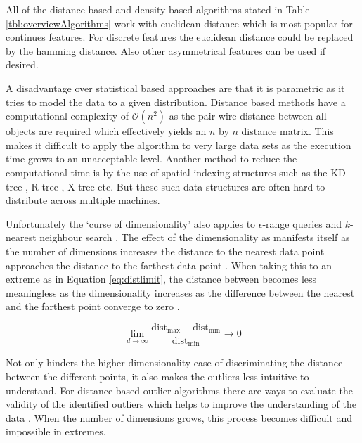 All of the distance-based and density-based algorithms stated in Table \ref{tbl:overviewAlgorithms} work with euclidean distance which is most popular for continues features. For discrete features the euclidean distance could be replaced by the hamming distance. Also other asymmetrical features can be used if desired. 

A disadvantage over statistical based approaches are that it is parametric as it tries to model the data to a given distribution. Distance based methods have a computational complexity of $\mathcal{O}(n^{2})$ as the pair-wire distance between all objects are required which effectively yields an $n$ by $n$ distance matrix. This makes it difficult to apply the algorithm to very large data sets as the execution time grows to an unacceptable level. Another method to reduce the computational time is by the use of spatial indexing structures such as the KD-tree \cite{Bentley:1975:MBS:361002.361007}, R-tree \cite{Guttman:1984:RDI:971697.602266}, X-tree \cite{Berchtold:1996:XIS:645922.673502} etc. But these such data-structures are often hard to distribute across multiple machines.

Unfortunately the `curse of dimensionality' also applies to $\epsilon$-range queries and $k$-nearest neighbour search \cite{citeulike:12369622}. The effect of the dimensionality as manifests itself as the number of dimensions increases the distance to the nearest data point approaches the distance to the farthest data point \cite{Beyer99whenis}. When taking this to an extreme as in Equation \ref{eq:distlimit}, the distance between becomes less meaningless as the dimensionality increases as the difference between the nearest and the farthest point converge to zero \cite{meaningnearestneighbour,Hinneburg:2000:NNH:645926.671675,Aggarwal01onthe}.

\begin{equation}
\lim_{d \to \infty} \frac{\text{dist}_{\text{max}} - \text{dist}_{\text{min}}}{\text{dist}_{\text{min}}} \to 0
\label{eq:distlimit}
\end{equation}

Not only hinders the higher dimensionality ease of discriminating the distance between the different points, it also makes the outliers less intuitive to understand. For distance-based outlier algorithms there are ways to evaluate the validity of the identified outliers which helps to improve the understanding of the data \cite{Knorr:1999:FIK:645925.671529}. When the number of dimensions grows, this process becomes difficult and impossible in extremes.

